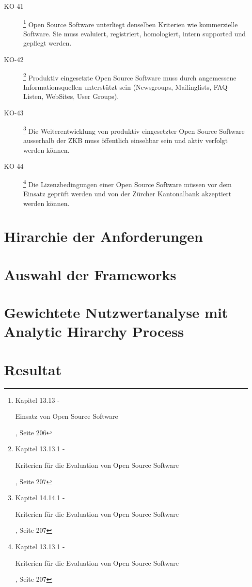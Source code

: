 \begin{description}
    \item[KO-41\label{itm:KO-41}]
    \footnote{\cite{ZkbHandbuchDerItArchitektur} Kapitel 13.13 -
    \begin{itshape}Einsatz von Open Source Software\end{itshape}, Seite 206}
    Open Source Software unterliegt denselben Kriterien wie kommerzielle
    Software. Sie muss evaluiert, registriert, homologiert, intern supported
    und gepflegt werden.    
    
    \item[KO-42\label{itm:KO-42}]
    \footnote{\cite{ZkbHandbuchDerItArchitektur} Kapitel 13.13.1 -
    \begin{itshape}Kriterien für die Evaluation von Open Source
    Software\end{itshape}, Seite 207}
    Produktiv eingesetzte Open Source Software muss durch angemessene
    Informationsquellen unterstützt sein (Newsgroups, Mailinglists,
    FAQ-Listen, WebSites, User Groups).    
    
    \item[KO-43\label{itm:KO-43}]
    \footnote{\cite{ZkbHandbuchDerItArchitektur} Kapitel 14.14.1 -
    \begin{itshape}Kriterien für die Evaluation von Open Source
    Software\end{itshape}, Seite 207}
    Die Weiterentwicklung von produktiv eingesetzter Open Source Software
    ausserhalb der ZKB muss öffentlich einsehbar sein und aktiv verfolgt werden
    können.
    
    \item[KO-44\label{itm:KO-44}]
    \footnote{\cite{ZkbHandbuchDerItArchitektur} Kapitel 13.13.1 -
    \begin{itshape}Kriterien für die Evaluation von Open Source
    Software\end{itshape}, Seite 207}
    Die Lizenzbedingungen einer Open Source Software müssen vor dem Einsatz
    geprüft werden und von der Zürcher Kantonalbank akzeptiert werden können.
  \end{description}

  \section{Hirarchie der Anforderungen}
  
  \section{Auswahl der Frameworks}
  
  \section{Gewichtete Nutzwertanalyse mit Analytic Hirarchy Process}
  
  \section{Resultat}
